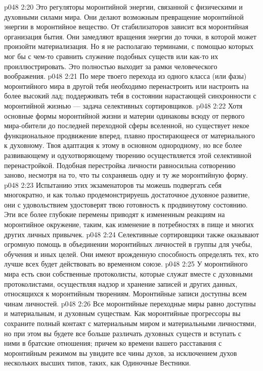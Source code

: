 \vs p048 2:20 \bibnobreakspace {} Это регуляторы моронтийной энергии, связанной с физическими и духовными силами мира. Они делают возможным превращение моронтийной энергии в моронтийное вещество. От стабилизаторов зависит вся моронтийная организация бытия. Они замедляют вращения энергии до точки, в которой может произойти материализация. Но я не располагаю терминами, с помощью которых мог бы с чем\hyp{}то сравнить служение подобных существ или как\hyp{}то их проиллюстрировать. Это полностью выходит за рамки человеческого воображения.
\vs p048 2:21 \bibnobreakspace {} По мере твоего перехода из одного класса (или фазы) моронтийного мира в другой тебя необходимо перенастроить или настроить на более высокий лад; поддерживать тебя в состоянии нарастающей синхронности с моронтийной жизнью --- задача селективных сортировщиков.
\vs p048 2:22 Хотя основные формы моронтийной жизни и материи одинаковы всюду от первого мира\hyp{}обители до последней переходной сферы вселенной, но существует некое функциональное продвижение вперед, плавно простирающееся от материального к духовному. Твоя адаптация к этому в основном однородному, но все более развивающему и одухотворяющему творению осуществляется этой селективной перенастройкой. Подобная перестройка личности равносильна сотворению заново, несмотря на то, что ты сохраняешь одну и ту же моронтийную форму.
\vs p048 2:23 Испытанию этих экзаменаторов ты можешь подвергать себя многократно, и как только продемонстрируешь достаточное духовное развитие, они с удовольствием удостоверят твою готовность к продвинутому состоянию. Эти все более глубокие перемены приводят к измененным реакциям на моронтийное окружение, таким, как изменение в потребностях в пище и многих других личных привычек.
\vs p048 2:24 Селективные сортировщики также оказывают огромную помощь в объединении моронтийных личностей в группы для учебы, обучения и иных целей. Они имеют врожденную способность определять тех, кто лучше всех будет действовать во временном союзе.
\vs p048 2:25 \bibnobreakspace {} У моронтийного мира есть свои собственные протоколисты, которые служат вместе с духовными протоколистами, осуществляя надзор и хранение записей и других данных, относящихся к моронтийным творениям. Моронтийные записи доступны всем чинам личностей.
\vs p048 2:26 Все моронтийные переходные миры равно доступны и материальным, и духовным существам. Как моронтийные прогрессоры вы сохраните полный контакт с материальным миром и материальными личностями, но при этом вы будете все больше различать духовных существ и вступать с ними в братские отношения; причем ко времени вашего расставания с моронтийным режимом вы увидите все чины духов, за исключением духов нескольких высших типов, таких, как Одиночные Вестники.
